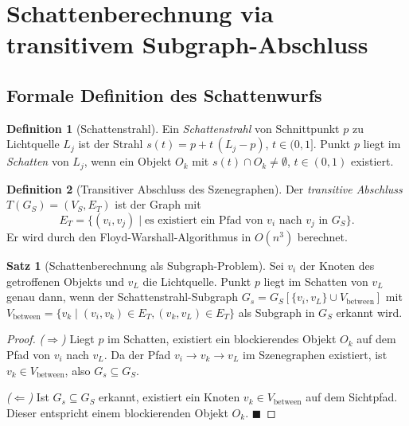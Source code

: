 ﻿\documentclass[a4paper,12pt]{article}
\theoremstyle{definition}
\newtheorem{definition}{Definition}[section]
\newtheorem{satz}{Satz}[section]
\begin{document}
\section{Schattenberechnung via transitivem Subgraph-Abschluss}

\subsection{Formale Definition des Schattenwurfs}

\begin{definition}[Schattenstrahl]
  \label{def:schattenstrahl}
  Ein \emph{Schattenstrahl} von Schnittpunkt $p$ zu Lichtquelle
  $L_j$ ist der Strahl $s(t) = p + t\,(L_j - p)$,
  $t \in (0, 1]$. Punkt $p$ liegt im \emph{Schatten} von $L_j$,
  wenn ein Objekt $O_k$ mit $s(t) \cap O_k \neq \emptyset$,
  $t \in (0,1)$ existiert.
\end{definition}

\begin{definition}[Transitiver Abschluss des Szenegraphen]
  \label{def:transitiver_abschluss}
  Der \emph{transitive Abschluss} $T(G_S) = (V_S, E_T)$ ist der
  Graph mit
  \[
    E_T = \bigl\{(v_i, v_j) \;\big|\;
    \text{es existiert ein Pfad von } v_i \text{ nach } v_j
    \text{ in } G_S\bigr\}.
  \]
  Er wird durch den Floyd-Warshall-Algorithmus in $O(n^3)$ berechnet.
\end{definition}

\begin{satz}[Schattenberechnung als Subgraph-Problem]
  \label{satz:schatten}
  Sei $v_i$ der Knoten des getroffenen Objekts und $v_L$ die
  Lichtquelle. Punkt $p$ liegt im Schatten von $v_L$ genau dann,
  wenn der Schattenstrahl-Subgraph
  $G_s = G_S[\{v_i, v_L\} \cup V_{\mathrm{between}}]$
  mit $V_{\mathrm{between}} = \{v_k \mid (v_i, v_k) \in E_T,
  (v_k, v_L) \in E_T\}$ als Subgraph in $G_S$ erkannt wird.
\end{satz}

\begin{proof}
  \emph{($\Rightarrow$)} Liegt $p$ im Schatten, existiert ein
  blockierendes Objekt $O_k$ auf dem Pfad von $v_i$ nach $v_L$.
  Da der Pfad $v_i \to v_k \to v_L$ im Szenegraphen existiert,
  ist $v_k \in V_{\mathrm{between}}$, also $G_s \subseteq G_S$.

  \emph{($\Leftarrow$)} Ist $G_s \subseteq G_S$ erkannt,
  existiert ein Knoten $v_k \in V_{\mathrm{between}}$ auf dem
  Sichtpfad. Dieser entspricht einem blockierenden Objekt $O_k$.
  \hfill$\blacksquare$
\end{proof}
\end{document}
